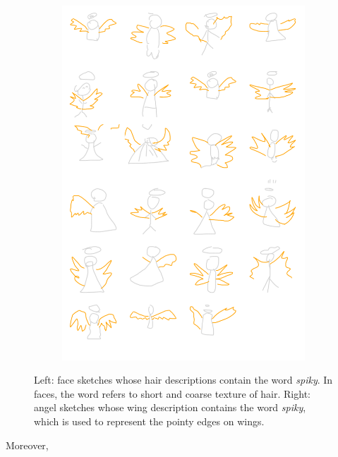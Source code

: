 \begin{figure}[!htb]
\begin{subfigure}{.5\textwidth}
\includegraphics[width=\linewidth]{data_collection/summary/spikyangel.png}  
\end{subfigure}
\caption{Left: face sketches whose hair descriptions contain the word \textit{spiky}. In faces, the word refers to short and coarse texture of hair. Right: angel sketches whose wing description contains the word \textit{spiky}, which is used to represent the pointy edges on wings.}
\label{datasummary.spiky}
\end{figure}

Moreover, 